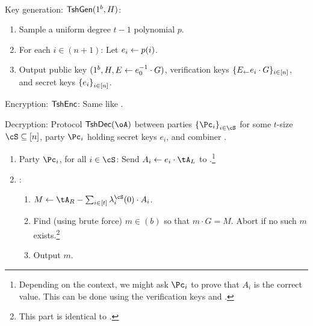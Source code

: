 \begin{algorithm}\label{alg:Tsh}~
	
	\item[Key generation:] $\mathsf{TshGen}(1^b,H)$:
	\begin{enumerate}
		\item Sample  a uniform degree $t-1$ polynomial  $p$. 
		
		\item For each $i\in (n+1)$: Let $e_i \leftarrow p(i)$.
		
		 
		
		 \item Output public key $(1^b,H,E \leftarrow e_0^{-1} \cdot G)$, verification keys $\{E_ \leftarrow e_i  \cdot G\}_{i\in [n]}$, and secret keys $\set{e_i}_{i\in [n]}$.
	\end{enumerate}
	

	
	\item[Encryption:]  $\mathsf{TshEnc}$:  Same like \EgEnc.
	
	
	
	\item[Decryption:] Protocol $\tdDec(\oA)$ between parties  $\set{\Pc_i}_{i\in \cS}$ for some $t$-size $\cS \subseteq [n]$, party $\Pc_i$ holding secret keys $e_i$, and combiner \Cc.
	
	\begin{enumerate}
		\item Party $\Pc_i$, for all $i\in \cS$:  Send   $A_i \asn e_i \cdot \tA_L$ to \Cc.\footnote{Depending on the context, we might ask $\Pc_i$ to prove that $A_i$ is  the correct value. This can be  done using  the verification keys and  \piZKPOK{\rEgConsSk}.}
		
		
		\item  \Cc: 
		\begin{enumerate}
			\item $M \asn \tA_R - \sum_{i\in [t]}   \lambda_i^\cS(0) \cdot A_i$.
			
			\item Find (using brute force) $m\in(b)$ so that $m\cdot G = M$. Abort if no such $m$ exists.\footnote{This part is identical to \EgDec.}
			
			\item Output $m$.
		\end{enumerate}
	\end{enumerate}
\end{algorithm}	

